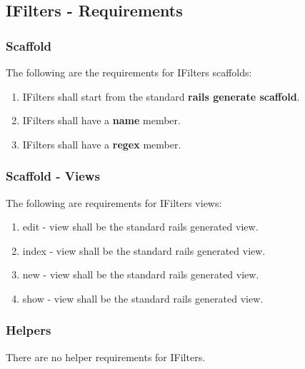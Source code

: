 \subsection{IFilters - Requirements}
\label{sec:document_spec} 

\subsubsection{Scaffold}
The following are the requirements for IFilters scaffolds:
\begin{enumerate}
	\item IFilters shall start from the standard \textbf{rails generate scaffold}.
	\item IFilters shall have a \textbf{name} member.
	\item IFilters shall have a \textbf{regex} member.
\end{enumerate}

\subsubsection{Scaffold - Views}
The following are requirements for IFilters views:
\begin{enumerate}
	\item edit - view shall be the standard rails generated view. 

	\item index - view shall be the standard rails generated view. 
	
	\item new - view shall be the standard rails generated view. 
	
	\item show - view shall be the standard rails generated view. 

\end{enumerate}


\subsubsection{Helpers}
There are no helper requirements for IFilters.
